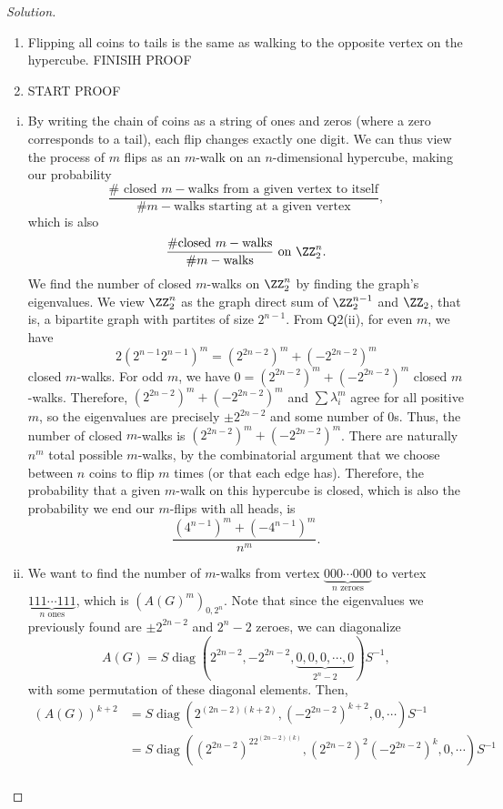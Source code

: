 \documentclass[11pt]{scrartcl}
\begin{document}
\begin{proof}[Solution]
\begin{enumerate}[{i}]
    \item Flipping all coins to tails is the same as walking to the opposite vertex on the hypercube. FINISIH PROOF
    \item START PROOF
\end{enumerate}
 \begin{enumerate}[(i)]
     \item By writing the chain of coins as a string of ones and zeros (where a zero corresponds to a tail), each flip changes exactly one digit. We can thus view the process of $m$ flips as an $m$-walk on an $n$-dimensional hypercube, making our probability \[\frac{\#\text{ closed }m-\text{walks from a given vertex to itself}}{\#m-\text{walks starting at a given vertex}},\]which is also \[\frac{\#\text{closed }m-\text{walks}}{\#m-\text{walks}}\text{ on }\ZZ_2^n.\] We find the number of closed $m$-walks on $\ZZ_2^n$ by finding the graph's eigenvalues. We view $\ZZ_2^n$ as the graph direct sum of $\ZZ_2^{n-1}$ and $\ZZ_2$, that is, a bipartite graph with partites of size $2^{n-1}$. From Q2(ii), for even $m$, we have \[2(2^{n-1}2^{n-1})^m=(2^{2n-2})^m+(-2^{2n-2})^m\] closed $m$-walks. For odd $m$, we have $0=(2^{2n-2})^m+(-2^{2n-2})^m$ closed $m$-walks. Therefore, $(2^{2n-2})^m+(-2^{2n-2})^m$ and $\sum\lambda_i^m$ agree for all positive $m$, so the eigenvalues are precisely $\pm2^{2n-2}$ and some number of $0$s. Thus, the number of closed $m$-walks is $(2^{2n-2})^m+(-2^{2n-2})^m$. There are naturally $n^m$ total possible $m$-walks,  by the combinatorial argument that we choose between $n$ coins to flip $m$ times (or that each edge has). Therefore, the probability that a given $m$-walk on this hypercube is closed, which is also the probability we end our $m$-flips with all heads, is \[\boxed{\frac{(4^{n-1})^m+(-4^{n-1})^m}{n^m}}.\]
     \item We want to find the number of $m$-walks from vertex $\underbrace{000\cdots000}_{n\text{ zeroes}}$ to vertex $\underbrace{111\cdots111}_{n\text{ ones}}$, which is $(A(G)^m)_{0,2^n}$. Note that since the eigenvalues we previously found are $\pm2^{2n-2}$ and $2^{n}-2$ zeroes, we can diagonalize \[A(G)=S\mathop{\mathrm{diag}}(2^{2n-2},-2^{2n-2},\underbrace{0,0,0,\cdots,0}_{2^n-2})S^{-1},\] with some permutation of these diagonal elements. Then, 
     \begin{align*}
         (A(G))^{k+2}&=S\mathop{\mathrm{diag}}(2^{(2n-2)(k+2)},(-2^{2n-2})^{k+2},0,\cdots)S^{-1}\\
         &=S\mathop{\mathrm{diag}}((2^{2n-2})^22^{(2n-2)(k)},(2^{2n-2})^2(-2^{2n-2})^{k},0,\cdots)S^{-1}\\

\end{align*}
\end{enumerate}
\end{proof}
\end{document}
